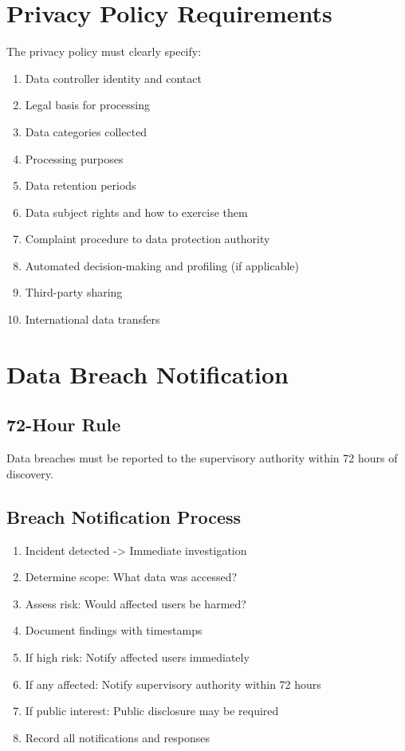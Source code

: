 \documentclass{report}
\begin{document}
\section{Privacy Policy Requirements}

The privacy policy must clearly specify:
\begin{enumerate}
\item Data controller identity and contact
\item Legal basis for processing
\item Data categories collected
\item Processing purposes
\item Data retention periods
\item Data subject rights and how to exercise them
\item Complaint procedure to data protection authority
\item Automated decision-making and profiling (if applicable)
\item Third-party sharing
\item International data transfers
\end{enumerate}

\section{Data Breach Notification}

\subsection{72-Hour Rule}
Data breaches must be reported to the supervisory authority within 72 hours of discovery.

\subsection{Breach Notification Process}
\begin{enumerate}
\item Incident detected -> Immediate investigation
\item Determine scope: What data was accessed?
\item Assess risk: Would affected users be harmed?
\item Document findings with timestamps
\item If high risk: Notify affected users immediately
\item If any affected: Notify supervisory authority within 72 hours
\item If public interest: Public disclosure may be required
\item Record all notifications and responses
\end{enumerate}
\end{document}
